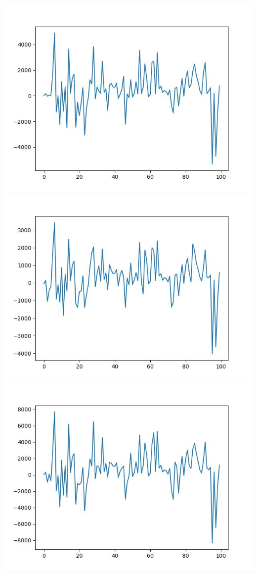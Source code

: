 \documentclass{article}
\begin{document}
\begin{multicols}{2}
    \begin{center}
        \includegraphics[scale = 0.2]{imgs/elisa/1.jpg}
        \includegraphics[scale = 0.2]{imgs/elisa/2.jpg}
        \includegraphics[scale = 0.2]{imgs/elisa/3.jpg}

\end{center}
\end{multicols}
\end{document}
